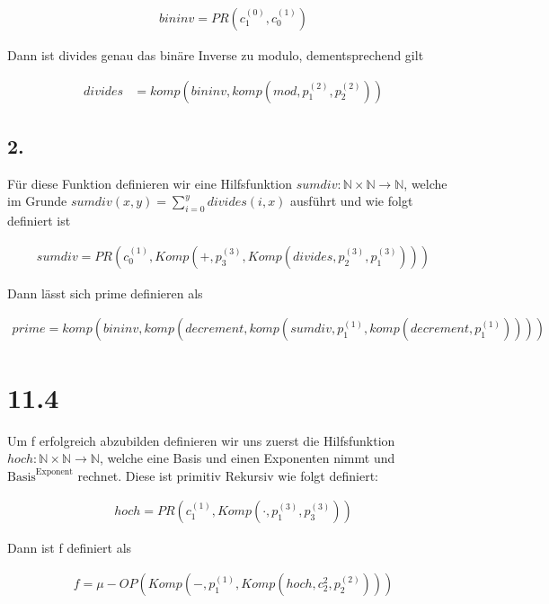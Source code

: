 \documentclass[12pt, a4paper]{article}
\begin{document}
\begin{align*}
bininv = PR(c_1^{(0)}, c_0^{(1)})
\end{align*}

Dann ist divides genau das binäre Inverse zu modulo, dementsprechend gilt

\begin{align*}
divides &= komp(bininv, komp(mod, p_1^{(2)}, p_2^{(2)}))
\end{align*}

\subsection*{2.}
Für diese Funktion definieren wir eine Hilfsfunktion $sumdiv: \mathbb{N} \times \mathbb{N} \rightarrow \mathbb{N}$, welche im Grunde $sumdiv(x,y) = \sum_{i = 0}^y divides(i,x)$ ausführt und wie folgt definiert ist

\begin{align*}
sumdiv = PR(c_0^{(1)}, Komp(+, p_3^{(3)}, Komp(divides, p_2^{(3)}, p_1^{(3)})))
\end{align*}

Dann lässt sich prime definieren als

\begin{align*}
prime = komp(bininv, komp(decrement, komp(sumdiv, p_1^{(1)}, komp(decrement, p_1^{(1)}))))
\end{align*}

\section*{11.4}
Um f erfolgreich abzubilden definieren wir uns zuerst die Hilfsfunktion $hoch: \mathbb{N} \times \mathbb{N} \rightarrow \mathbb{N}$, welche eine Basis und einen Exponenten nimmt und $\text{Basis}^{\text{Exponent}}$ rechnet. Diese ist primitiv Rekursiv wie folgt definiert:

\begin{align*}
hoch = PR(c_1^{(1)}, Komp(\cdot, p_1^{(3)}, p_3^{(3)}))
\end{align*}

Dann ist f definiert als

\begin{align*}
f = \mu-OP(Komp(-, p_1^{(1)}, Komp(hoch, c_2^2, p_2^{(2)})))
\end{align*}
\end{document}
